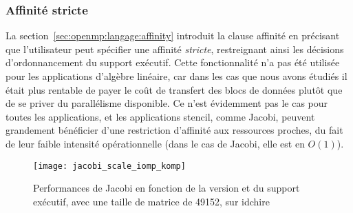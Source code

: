 


\subsubsection{Affinité stricte}

La section~\ref{sec:openmp:langage:affinity} introduit la clause affinité en précisant que l'utilisateur peut spécifier une affinité \emph{stricte}, restreignant ainsi les décisions d'ordonnancement du support exécutif.
Cette fonctionnalité n'a pas été utilisée pour les applications d'algèbre linéaire, car dans les cas que nous avons étudiés il était plus rentable de payer le coût de transfert des blocs de données plutôt que de se priver du parallélisme disponible.
Ce n'est évidemment pas le cas pour toutes les applications, et les applications stencil, comme Jacobi, peuvent grandement bénéficier d'une restriction d'affinité aux ressources proches, du fait de leur faible intensité opérationnelle (dans le cas de Jacobi, elle est en $O(1)$).

\begin{figure}[ht]
  \centering
  \texttt{[image: jacobi\_scale\_iomp\_komp]}
  \caption{Performances de Jacobi en fonction de la version et du support exécutif, avec une taille de matrice de 49152, sur idchire}\label{fig:contribs:perf_eval:eval-jacobi}
\end{figure}

